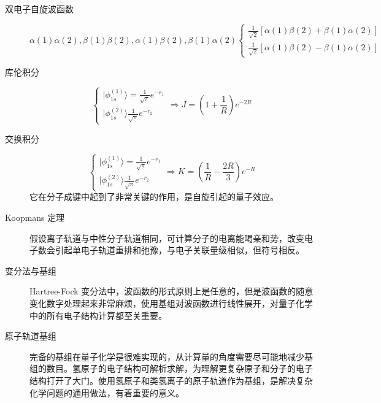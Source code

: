 \documentclass[12pt,a4paper,openany,twoside]{book}
\numberwithin{equation}{section}
\newcommand{\ket}[1]{| #1 \rangle}
\begin{document}
\begin{description}
      \item[双电子自旋波函数]
      \begin{equation}
        \alpha(1)\alpha(2),\beta(1)\beta(2),\alpha(1)\beta(2),\beta(1)\alpha(2)
        \begin{cases}
        \frac{1}{\sqrt{2}}[\alpha(1)\beta(2)+\beta(1)\alpha(2)]\\
        \frac{1}{\sqrt{2}}[\alpha(1)\beta(2)-\beta(1)\alpha(2)]
        \end{cases}
      \end{equation}
  
    \end{description}
    \begin{description}
    \item[库伦积分]
    \begin{equation}
    \begin{cases}
    \ket{\phi_{1s}^{(1)}}=\frac{1}{\sqrt{\pi}}e^{-r_1}\\
    \ket{\phi_{1s}^{(2)}}\frac{1}{\sqrt{\pi}}e^{-r_2}
    \end{cases}
    \Rightarrow J=(1+\frac{1}{R})e^{-2R}
    \end{equation}
  
    \item[交换积分]
    \begin{equation}
    \begin{cases}
    \ket{\phi_{1s}^{(1)}}=\frac{1}{\sqrt{\pi}}e^{-r_1}\\
    \ket{\phi_{1s}^{(2)}}\frac{1}{\sqrt{\pi}}e^{-r_2}
    \end{cases}
    \Rightarrow K=(\frac{1}{R}-\frac{2R}{3})e^{-R}
    \end{equation}
    它在分子成键中起到了非常关键的作用，是自旋引起的量子效应。

    \item[Koopmans 定理]假设离子轨道与中性分子轨道相同，可计算分子的电离能喝亲和势，改变电子数会引起单电子轨道重排和弛豫，与电子关联量级相似，但符号相反。

    \item[变分法与基组] Hartree-Fock 变分法中，波函数的形式原则上是任意的，但是波函数的随意变化数字处理起来非常麻烦，使用基组对波函数进行线性展开，对量子化学中的所有电子结构计算都至关重要。
  
    \item[原子轨道基组] 完备的基组在量子化学是很难实现的，从计算量的角度需要尽可能地减少基组的数目。氢原子的电子结构可解析求解，为理解更复杂原子和分子的电子结构打开了大门。使用氢原子和类氢离子的原子轨道作为基组，是解决复杂化学问题的通用做法，有着重要的意义。
  

\end{description}
\end{document}
